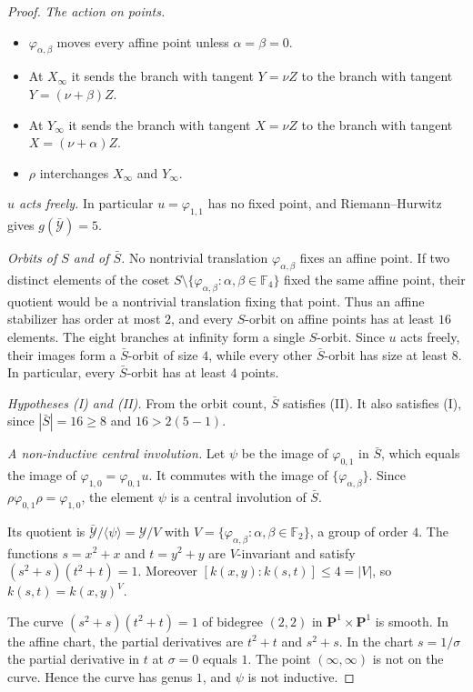 \documentclass[11pt]{article}
\theoremstyle{remark}
\newcommand{\F}{\mathbb F}
\begin{document}
\begin{proof}
\emph{The action on points.}
\begin{itemize}
\item $\varphi_{\alpha,\beta}$ moves every affine point unless
$\alpha=\beta=0$.
\item At $X_\infty$ it sends the branch with tangent $Y=\nu Z$ to the
branch with tangent $Y=(\nu+\beta)Z$.
\item At $Y_\infty$ it sends the branch with tangent $X=\nu Z$ to the
branch with tangent $X=(\nu+\alpha)Z$.
\item $\rho$ interchanges $X_\infty$ and $Y_\infty$.
\end{itemize}

\emph{$u$ acts freely.} In particular $u=\varphi_{1,1}$ has no fixed
point, and Riemann--Hurwitz gives $g(\bar{\mathcal Y})=5$.

\emph{Orbits of $S$ and of $\bar S$.} No nontrivial translation
$\varphi_{\alpha,\beta}$ fixes an affine point.  If two distinct elements
of the coset $S\setminus\{\varphi_{\alpha,\beta}:\alpha,\beta\in\F_4\}$
fixed the same affine point, their quotient would be a nontrivial
translation fixing that point.  Thus an affine stabilizer has order at
most $2$, and every $S$-orbit on affine points has at least $16$ elements.
The eight branches at infinity form a single $S$-orbit.  Since $u$ acts
freely, their images form a $\bar S$-orbit of size $4$, while every
other $\bar S$-orbit has size at least $8$.  In particular, every
$\bar S$-orbit has at least $4$ points.

\emph{Hypotheses (I) and (II).} From the orbit count, $\bar S$ satisfies
\textup{(II)}. It also satisfies \textup{(I)}, since
$|\bar S|=16\ge8$ and $16>2(5-1)$.

\emph{A non-inductive central involution.} Let $\psi$ be the image of
$\varphi_{0,1}$ in $\bar S$, which equals the image of
$\varphi_{1,0}=\varphi_{0,1}u$. It commutes with the image of
$\{\varphi_{\alpha,\beta}\}$. Since $\rho\varphi_{0,1}\rho=\varphi_{1,0}$,
the element $\psi$ is a central involution of $\bar S$.

Its quotient is $\bar{\mathcal Y}/\langle\psi\rangle=\mathcal Y/V$ with
$V=\{\varphi_{\alpha,\beta}:\alpha,\beta\in\F_2\}$, a group of order $4$.
The functions $s=x^2+x$ and $t=y^2+y$ are $V$-invariant and satisfy
$(s^2+s)(t^2+t)=1$. Moreover $[k(x,y):k(s,t)]\le4=|V|$, so
$k(s,t)=k(x,y)^V$.

The curve $(s^2+s)(t^2+t)=1$ of bidegree $(2,2)$ in
$\mathbf P^1\times\mathbf P^1$ is smooth. In the affine chart, the
partial derivatives are $t^2+t$ and $s^2+s$. In the chart $s=1/\sigma$
the partial derivative in $t$ at $\sigma=0$ equals $1$. The point
$(\infty,\infty)$ is not on the curve. Hence the curve has genus $1$,
and $\psi$ is not inductive.


\end{proof}
\end{document}
